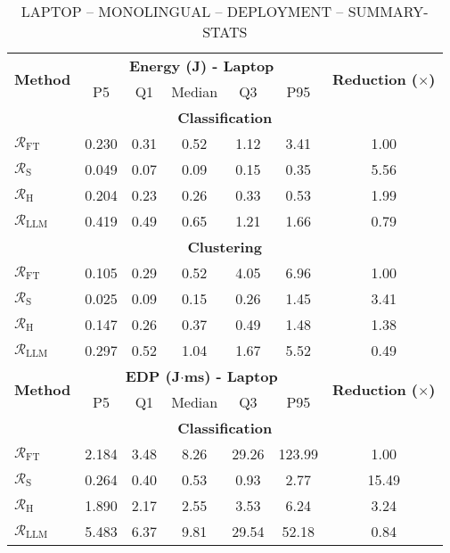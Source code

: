 \begin{table}[t]
\centering
\scriptsize
\caption{LAPTOP -- MONOLINGUAL -- DEPLOYMENT -- SUMMARY-STATS}
\label{tab:laptop_rq1}
\begin{tabular}{lcccccc}
\toprule
\multirow{2}{*}{\textbf{Method}} 
& \multicolumn{5}{c}{\textbf{Energy (J) - Laptop}} & \multirow{2}{*}{\textbf{Reduction ($\times$)}} \\
\cmidrule(lr){2-6}
 & P5 & Q1 & Median & Q3 & P95 &  \\
\midrule
\multicolumn{7}{c}{\textbf{Classification}} \\  %
$\mathcal{R}_\text{FT}$ & 0.230 & 0.31 & 0.52 & 1.12 & 3.41 & 1.00 \\ %
$\mathcal{R}_\text{S}$ & 0.049 & 0.07 & 0.09 & 0.15 & 0.35 & 5.56 \\ %
$\mathcal{R}_\text{H}$ & 0.204 & 0.23 & 0.26 & 0.33 & 0.53 & 1.99 \\ %
$\mathcal{R}_\text{LLM}$ & 0.419 & 0.49 & 0.65 & 1.21 & 1.66 & 0.79 \\ %
\multicolumn{7}{c}{\textbf{Clustering}} \\  %
$\mathcal{R}_\text{FT}$ & 0.105 & 0.29 & 0.52 & 4.05 & 6.96 & 1.00 \\ %
$\mathcal{R}_\text{S}$ & 0.025 & 0.09 & 0.15 & 0.26 & 1.45 & 3.41 \\ %
$\mathcal{R}_\text{H}$ & 0.147 & 0.26 & 0.37 & 0.49 & 1.48 & 1.38 \\ %
$\mathcal{R}_\text{LLM}$ & 0.297 & 0.52 & 1.04 & 1.67 & 5.52 & 0.49 \\ %
\midrule
\multirow{2}{*}{\textbf{Method}} 
& \multicolumn{5}{c}{\textbf{EDP (J$\cdot$ms) - Laptop}} & \multirow{2}{*}{\textbf{Reduction ($\times$)}} \\
\cmidrule(lr){2-6}
 & P5 & Q1 & Median & Q3 & P95 & \\
\midrule
\multicolumn{7}{c}{\textbf{Classification}} \\  %
$\mathcal{R}_\text{FT}$ & 2.184 & 3.48 & 8.26 & 29.26 & 123.99 & 1.00 \\ %
$\mathcal{R}_\text{S}$ & 0.264 & 0.40 & 0.53 & 0.93 & 2.77 & 15.49 \\ %
$\mathcal{R}_\text{H}$ & 1.890 & 2.17 & 2.55 & 3.53 & 6.24 & 3.24 \\ %
$\mathcal{R}_\text{LLM}$ & 5.483 & 6.37 & 9.81 & 29.54 & 52.18 & 0.84 \\ %

\end{tabular}
\end{table}

